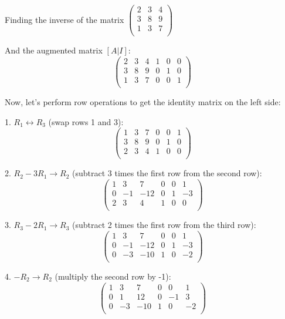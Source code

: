 Finding the inverse of the matrix 
$\begin{pmatrix}
    2 & 3 & 4\\
    3 & 8 & 9\\
    1 & 3 & 7\\
\end{pmatrix}$

And the augmented matrix $[A | I]$:
\[
\left(\begin{array}{ccc|ccc}
    2 & 3 & 4 & 1 & 0 & 0\\
    3 & 8 & 9 & 0 & 1 & 0\\
    1 & 3 & 7 & 0 & 0 & 1\\
\end{array}\right)
\]

Now, let's perform row operations to get the identity matrix on the left side:

1. $R_1 \leftrightarrow R_3$ (swap rows 1 and 3):
\[
\left(\begin{array}{ccc|ccc}
    1 & 3 & 7 & 0 & 0 & 1\\
    3 & 8 & 9 & 0 & 1 & 0\\
    2 & 3 & 4 & 1 & 0 & 0\\
\end{array}\right)
\]

2. $R_2 - 3R_1 \rightarrow R_2$ (subtract 3 times the first row from the second row):
\[
\left(\begin{array}{ccc|ccc}
    1 & 3 & 7 & 0 & 0 & 1\\
    0 & -1 & -12 & 0 & 1 & -3\\
    2 & 3 & 4 & 1 & 0 & 0\\
\end{array}\right)
\]

3. $R_3 - 2R_1 \rightarrow R_3$ (subtract 2 times the first row from the third row):
\[
\left(\begin{array}{ccc|ccc}
    1 & 3 & 7 & 0 & 0 & 1\\
    0 & -1 & -12 & 0 & 1 & -3\\
    0 & -3 & -10 & 1 & 0 & -2\\
\end{array}\right)
\]

4. $-R_2 \rightarrow R_2$ (multiply the second row by -1):
\[
\left(\begin{array}{ccc|ccc}
    1 & 3 & 7 & 0 & 0 & 1\\
    0 & 1 & 12 & 0 & -1 & 3\\
    0 & -3 & -10 & 1 & 0 & -2\\
\end{array}\right)
\]

